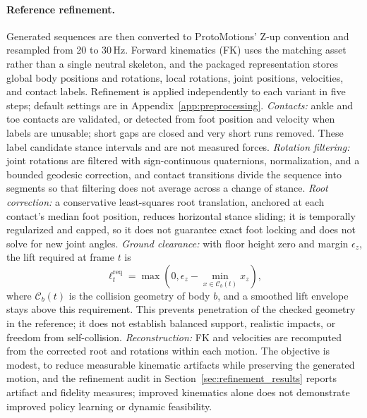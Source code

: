 \paragraph{Reference refinement.}
Generated sequences are then converted to ProtoMotions' Z-up convention and
resampled from 20 to 30\,Hz. Forward kinematics (FK) uses the matching asset
rather than a single neutral skeleton, and the packaged representation stores
global body positions and rotations, local rotations, joint positions,
velocities, and contact labels. Refinement is applied independently to each
variant in five steps; default settings are in
Appendix~\ref{app:preprocessing}. \emph{Contacts:} ankle and toe contacts
are validated, or detected from foot position and velocity when labels are
unusable; short gaps are closed and very short runs removed. These label
candidate stance intervals and are not measured forces. \emph{Rotation
filtering:} joint rotations are filtered with sign-continuous quaternions,
normalization, and a bounded geodesic correction, and contact transitions divide
the sequence into segments so that filtering does not average across a change of
stance. \emph{Root correction:} a conservative least-squares root translation,
anchored at each contact's median foot position, reduces horizontal stance
sliding; it is temporally regularized and capped, so it does not guarantee exact
foot locking and does not solve for new joint angles. \emph{Ground clearance:}
with floor height zero and margin $\epsilon_z$, the lift required at frame $t$ is
\begin{equation}
    \ell_t^{\mathrm{req}}
      = \max\!\left(0,\epsilon_z-\min_{x\in\mathcal{C}_b(t)}x_z\right),
    \label{eq:clearance}
\end{equation}
where $\mathcal{C}_b(t)$ is the collision geometry of body $b$, and a smoothed
lift envelope stays above this requirement. This prevents penetration of the
checked geometry in the reference; it does not establish balanced support,
realistic impacts, or freedom from self-collision. \emph{Reconstruction:} FK and
velocities are recomputed from the corrected root and rotations within each
motion. The objective is modest, to reduce measurable kinematic artifacts while
preserving the generated motion, and the refinement audit in Section~\ref{sec:refinement_results}
reports artifact and fidelity measures; improved kinematics alone does not
demonstrate improved policy learning or dynamic feasibility.

